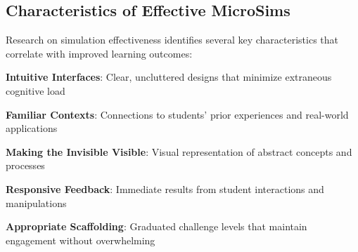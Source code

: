 \subsection{Characteristics of Effective MicroSims}

Research on simulation effectiveness identifies several key characteristics that correlate with improved learning outcomes:

\textbf{Intuitive Interfaces}: Clear, uncluttered designs that minimize extraneous cognitive load

\textbf{Familiar Contexts}: Connections to students' prior experiences and real-world applications

\textbf{Making the Invisible Visible}: Visual representation of abstract concepts and processes

\textbf{Responsive Feedback}: Immediate results from student interactions and manipulations

\textbf{Appropriate Scaffolding}: Graduated challenge levels that maintain engagement without overwhelming

